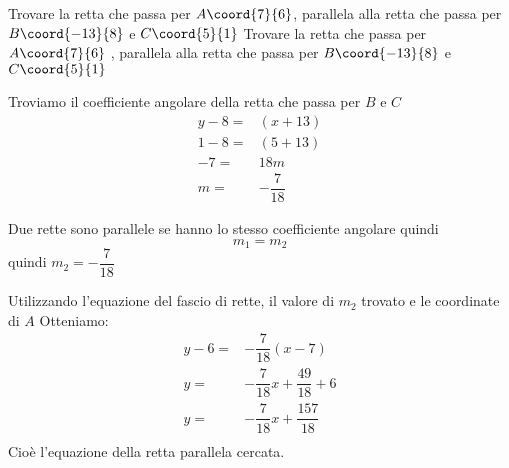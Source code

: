 \begin{exercise}
	Trovare la retta che passa per $A\coord{7}{6}$, parallela alla retta che passa per $B\coord{-13}{8}$ e $C\coord{5}{1}$
	\tcblower
	Trovare la retta che passa per $A\coord{7}{6}$ , parallela alla retta che passa per $B\coord{-13}{8}$ e $C\coord{5}{1}$
	
	Troviamo il coefficiente angolare della retta che passa per $B$ e $C$
	\begin{align*}
		y-8=&(x+13)\\
		1-8=&(5+13)\\
		-7=&18m\\
		m=&-\dfrac{7}{18}
	\end{align*}
	
	Due rette sono parallele se hanno lo stesso coefficiente angolare quindi \[m_1=m_2 \]
	quindi $m_2=-\dfrac{7}{18}$ 
	
	Utilizzando l'equazione del fascio di rette, il valore di $m_2$ trovato e le coordinate di $A$ Otteniamo:
	\begin{align*}
		y-6=&-\dfrac{7}{18}(x-7)\\
		y=&-\dfrac{7}{18}x+\dfrac{49}{18}+6\\
		y=&-\dfrac{7}{18}x+\dfrac{157}{18}\\
	\end{align*}
	Cioè l'equazione della retta parallela cercata.	
	\begin{center}
		
	\end{center}
\end{exercise}	
